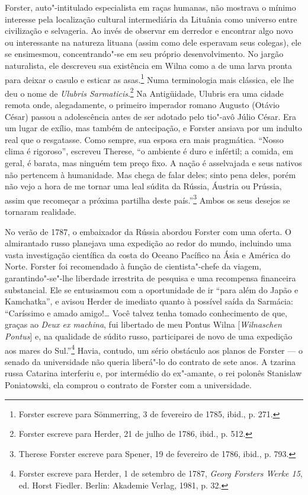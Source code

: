 Forster, auto"-intitulado especialista em raças humanas, não mostrava o
mínimo interesse pela localização cultural intermediária da Lituânia
como universo entre civilização e selvageria. Ao invés de observar em
derredor e encontrar algo novo ou interessante na natureza lituana
(assim como dele esperavam seus colegas), ele se ensimesmou,
concentrando"-se em seu próprio desenvolvimento. No jargão naturalista,
ele descreveu sua existência em Wilna como a de uma larva pronta para
deixar o casulo e esticar as asas.\footnote{Forster escreve para
  Sömmerring, 3 de fevereiro de 1785, ibid., p. 271.} Numa terminologia
mais clássica, ele lhe deu o nome de \emph{Ulubris
Sarmaticis}.\footnote{Forster escreve para Herder, 21 de julho de 1786,
  ibid., p. 512.} Na Antigüidade, Ulubris era uma cidade remota onde,
alegadamente, o primeiro imperador romano Augusto (Otávio César) passou
a adolescência antes de ser adotado pelo tio"-avô Júlio César. Era um
lugar de exílio, mas também de antecipação, e Forster ansiava por um
indulto real que o resgatasse. Como sempre, sua esposa era mais
pragmática. ``Nosso clima é rigoroso'', escreveu Therese, ``o ambiente é
duro e infértil; a comida, em geral, é barata, mas ninguém tem preço
fixo. A nação é asselvajada e seus nativos não pertencem à humanidade.
Mas chega de falar deles; sinto pena deles, porém não vejo a hora de me
tornar uma leal súdita da Rússia, Áustria ou Prússia, assim que
recomeçar a próxima partilha deste país.''\footnote{Therese Forster
  escreve para Spener, 19 de fevereiro de 1786, ibid., p. 793.} Ambos os
seus desejos se tornaram realidade.

No verão de 1787, o embaixador da Rússia abordou Forster com uma oferta.
O almirantado russo planejava uma expedição ao redor do mundo, incluindo
uma vasta investigação científica da costa do Oceano Pacífico na Ásia e
América do Norte. Forster foi recomendado à função de cientista"-chefe da
viagem, garantindo"-se"-lhe liberdade irrestrita de pesquisa e uma
recompensa financeira substancial. Ele se entusiasmou com a oportunidade
de ir ``para além do Japão e Kamchatka'', e avisou Herder de imediato
quanto à possível saída da Sarmácia: ``Caríssimo e amado amigo!\ldots{}
Você talvez tenha tomado conhecimento de que, graças ao \emph{Deux ex
machina}, fui libertado de meu Pontus Wilna {[}\emph{Wilnaschen
Pontus}{]} e, na qualidade de súdito russo, participarei de novo de uma
expedição aos mares do Sul.''\footnote{Forster escreve para Herder, 1 de
  setembro de 1787, \emph{Georg Forsters Werke 15}, ed. Horst Fiedler.
  Berlin: Akademie Verlag, 1981, p. 32.} Havia, contudo, um sério
obstáculo aos planos de Forster --- o senado da universidade não queria
liberá"-lo do contrato de sete anos. A tzarina russa Catarina 
interferiu e, por intermédio do ex"-amante, o rei polonês Stanislaw
Poniatowski, ela comprou o contrato de Forster com a universidade.

